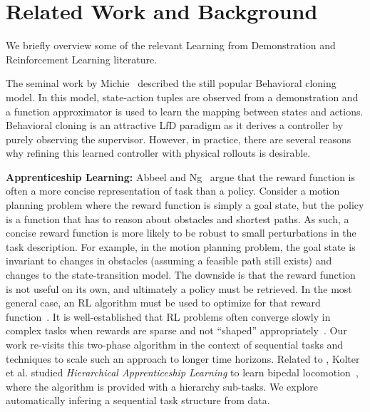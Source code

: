 %
\section{Related Work and Background}
We briefly overview some of the relevant Learning from Demonstration and Reinforcement Learning literature.

The seminal work by Michie~\cite{michie1996behavioural} described the still popular Behavioral cloning model.
In this model, state-action tuples are observed from a demonstration and a function approximator is used to learn the mapping
between states and actions.
Behavioral cloning is an attractive LfD paradigm as it derives a controller by purely observing the supervisor.
However, in practice, there are several reasons why refining this learned controller with physical rollouts is desirable.

\vspace{0.5em}\noindent\textbf{Apprenticeship Learning: } Abbeel and Ng~\cite{ng2000algorithms, abbeel2004apprenticeship} argue that the reward function is often a more concise representation of task than a policy. Consider a motion planning problem where the reward function is simply a goal state, but the policy is a function that has to reason about obstacles and shortest paths. As such, a concise reward function is more likely to be robust to small perturbations in the task description. For example, in the motion planning problem, the goal state is invariant to changes in obstacles (assuming a feasible path still exists) and changes to the state-transition model. 
The downside is that the reward function is not useful on its own, and ultimately a policy must be retrieved. In the most general case, an RL algorithm must be used to optimize for that reward function~\cite{abbeel2004apprenticeship}.
It is well-established that RL problems often converge slowly in complex tasks when rewards are sparse and not ``shaped'' appropriately~\cite{DBLP:conf/icml/NgHR99, DBLP:conf/aaai/JudahFTG14}.
Our work re-visits this two-phase algorithm in the context of sequential tasks and techniques to scale such an approach to longer time horizons.
Related to \hirl, Kolter et al. studied  \emph{Hierarchical Apprenticeship Learning} to learn bipedal locomotion~\cite{DBLP:conf/nips/KolterAN07}, where the algorithm is provided with a hierarchy sub-tasks.
We explore automatically infering a sequential task structure from data.

